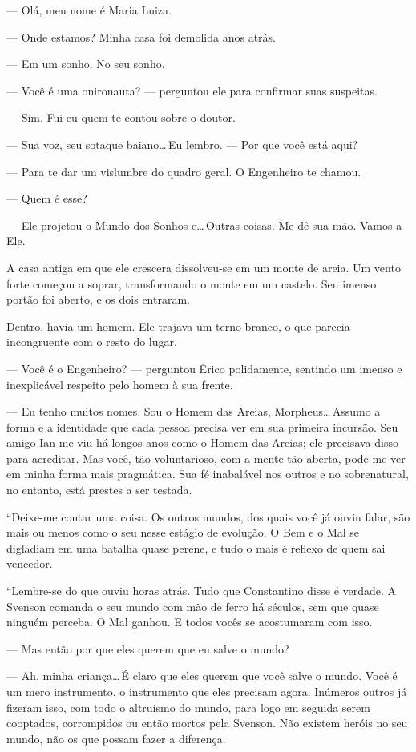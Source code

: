 --- Olá, meu nome é Maria Luiza.

--- Onde estamos? Minha casa foi demolida anos atrás.

--- Em um sonho. No seu sonho.

--- Você é uma onironauta? --- perguntou ele para confirmar suas suspeitas.

--- Sim. Fui eu quem te contou sobre o doutor.

--- Sua voz, seu sotaque baiano\ldots\,Eu lembro. --- Por que você está aqui?

--- Para te dar um vislumbre do quadro geral. O Engenheiro te chamou.

--- Quem é esse?

--- Ele projetou o Mundo dos Sonhos e\ldots\,Outras coisas. Me dê sua mão.
Vamos a Ele.

A casa antiga em que ele crescera dissolveu-se em um monte de areia. Um vento
forte começou a soprar, transformando o monte em um castelo. Seu imenso portão
foi aberto, e os dois entraram.

Dentro, havia um homem. Ele trajava um terno branco, o que parecia incongruente
com o resto do lugar.

--- Você é o Engenheiro? --- perguntou Érico polidamente, sentindo um imenso e
inexplicável respeito pelo homem à sua frente.

--- Eu tenho muitos nomes. Sou o Homem das Areias, Morpheus\ldots\,Assumo a
forma e a identidade que cada pessoa precisa ver em sua primeira incursão. Seu
amigo Ian me viu há longos anos como o Homem das Areias; ele precisava disso
para acreditar. Mas você, tão voluntarioso, com a mente tão aberta, pode me ver
em minha forma mais pragmática. Sua fé inabalável nos outros e no sobrenatural,
no entanto, está prestes a ser testada.

“Deixe-me contar uma coisa. Os outros mundos, dos quais você já ouviu falar,
são mais ou menos como o seu nesse estágio de evolução. O Bem e o Mal se
digladiam em uma batalha quase perene, e tudo o mais é reflexo de quem sai
vencedor.

“Lembre-se do que ouviu horas atrás. Tudo que Constantino disse é verdade. A
Svenson comanda o seu mundo com mão de ferro há séculos, sem que quase ninguém
perceba. O Mal ganhou. E todos vocês se acostumaram com isso.

--- Mas então por que eles querem que eu salve o mundo?

--- Ah, minha criança\ldots\,É claro que eles querem que você salve o mundo.
Você é um mero instrumento, o instrumento que eles precisam agora. Inúmeros
outros já fizeram isso, com todo o altruísmo do mundo, para logo em seguida
serem cooptados, corrompidos ou então mortos pela Svenson. Não existem heróis
no seu mundo, não os que possam fazer a diferença.

